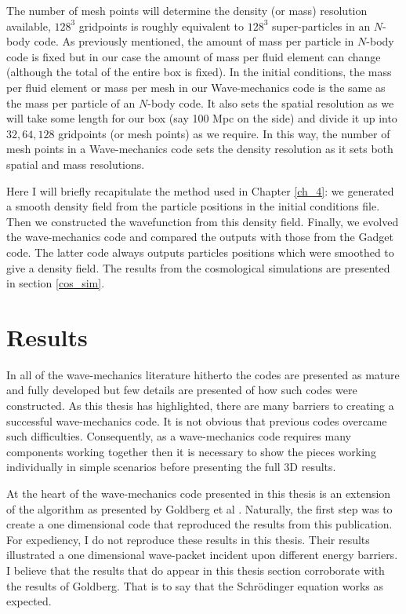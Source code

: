The number of mesh points will determine the density (or mass) resolution available, $128^3$ gridpoints is roughly equivalent to $128^3$ super-particles in an $N$-body code. As previously mentioned, the amount of mass per particle in $N$-body code is fixed but in our case the amount of mass per fluid element can change (although the total of the entire box is fixed). In the initial conditions, the mass per fluid element or mass per mesh in our Wave-mechanics code is the same as the mass per particle of an $N$-body code.  It also sets the spatial resolution as we will take some length for our box (say 100 Mpc on the side) and divide it up into $32, 64, 128$ gridpoints (or mesh points) as we require. In this way, the number of mesh points in a Wave-mechanics code sets the density resolution as it sets both spatial and mass resolutions.

Here I will briefly recapitulate the method used in Chapter \ref{ch_4}: we generated a smooth density field from the particle positions in the initial conditions file. Then we constructed the wavefunction from this density field. Finally, we evolved the wave-mechanics code and compared the outputs with those from the Gadget code. The latter code always outputs particles positions which were smoothed to give a density field. The results from the cosmological simulations are presented in section \ref{cos_sim}.

\section{Results}
\label{ch5_results}
In all of the wave-mechanics literature hitherto the codes are presented as mature and fully developed but few details are presented of how such codes were constructed. As this thesis has highlighted, there are many barriers to creating a successful wave-mechanics code. It is not obvious that previous codes overcame such difficulties. Consequently, as a wave-mechanics code requires many components working together then it is necessary to show the pieces working individually in simple scenarios before presenting the full 3D results.

At the heart of the wave-mechanics code presented in this thesis is an extension of the algorithm as presented by Goldberg et al \citep{bib_gold}. Naturally, the first step was to create a one dimensional code that reproduced the results from this publication. For expediency, I do not reproduce these results in this thesis. Their results illustrated a one dimensional wave-packet incident upon different energy barriers. I believe that the results that do appear in this thesis section corroborate with the results of Goldberg. That is to say that the Schr\"odinger equation works as expected.

